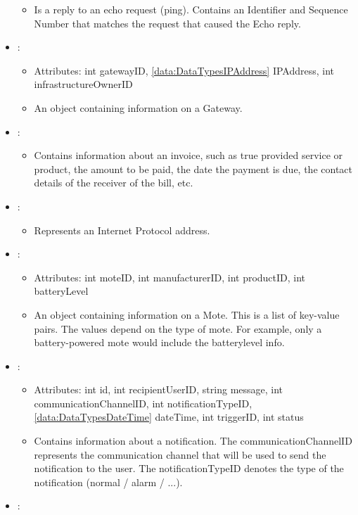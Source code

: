 \begin{itemize}[nolistsep,noitemsep]
\begin{itemize}[noitemsep,nolistsep]
\item[] Is a reply to an echo request (ping). Contains an Identifier and Sequence Number that matches the request that caused the Echo reply.
\end{itemize}
\item {}: 
\begin{itemize}[noitemsep,nolistsep]
\item[] Attributes: int gatewayID, \ref{data:DataTypesIPAddress} IPAddress, int infrastructureOwnerID
\item[] An object containing information on a Gateway.
\end{itemize}
\item {}: 
\begin{itemize}[noitemsep,nolistsep]

\item[] Contains information about an invoice, such as true provided service or product, the amount to be paid, the date the payment is due, the contact details of the receiver of the bill, etc.
\end{itemize}
\item {}: 
\begin{itemize}[noitemsep,nolistsep]

\item[] Represents an Internet Protocol address.
\end{itemize}
\item {}: 
\begin{itemize}[noitemsep,nolistsep]
\item[] Attributes: int moteID, int manufacturerID, int productID, int batteryLevel
\item[] An object containing information on a Mote. This is a list of key-value pairs. The values depend on the type of mote. For example, only a battery-powered mote would include the batterylevel info.
\end{itemize}
\item {}: 
\begin{itemize}[noitemsep,nolistsep]
\item[] Attributes: int id, int recipientUserID, string message, int communicationChannelID, int notificationTypeID, \ref{data:DataTypesDateTime} dateTime, int triggerID, int status
\item[] Contains information about a notification. The communicationChannelID represents the communication channel that will be used to send the notification to the user. The notificationTypeID denotes the type of the notification (normal / alarm / ...).
\end{itemize}
\item {}: 
\begin{itemize}


\end{itemize}
\end{itemize}
